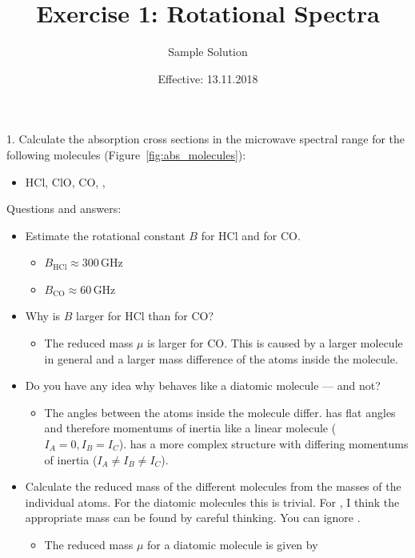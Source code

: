 \documentclass[paper=a4, fontsize=11pt]{scrartcl}
\title{Exercise 1: Rotational Spectra}
\author{Sample Solution}
\date{Effective: 13.11.2018}
\begin{document}
\maketitle

1. Calculate the absorption cross sections in the microwave spectral range for
the following molecules (Figure~\ref{fig:abs_molecules}):
\begin{itemize}
    \item HCl, ClO, CO, , 
\end{itemize}

Questions and answers:
\begin{itemize}
    \item Estimate the rotational constant $B$ for HCl and for CO.
    \begin{itemize}
      \item $B_{\mathrm{HCl}} \approx 300$\,GHz
      \item $B_{\mathrm{CO}} \approx 60$\,GHz
    \end{itemize}
    \item Why is $B$ larger for HCl than for CO?
    \begin{itemize}
        \item The reduced mass $\mu$ is larger for CO. This is caused by a
            larger molecule in general and a larger mass difference of the
            atoms inside the molecule.
    \end{itemize}
    \item Do you have any idea why  behaves like a diatomic molecule
        --- and  not?
    \begin{itemize}
      \item The angles between the atoms inside the molecule differ.
             has flat angles and therefore momentums of inertia like
            a linear molecule ($I_A = 0, I_B = I_C$).  has a more
            complex structure with differing momentums of inertia ($I_A \neq
            I_B \neq I_C$).
    \end{itemize}
    \item Calculate the reduced mass of the different molecules from the masses
        of the individual atoms. For the diatomic molecules this is trivial.
        For , I think the appropriate mass can be found by careful
        thinking. You can ignore .
        \begin{itemize}
          \item The reduced mass $\mu$ for a diatomic molecule is given by

\end{itemize}
\end{itemize}
\end{document}
